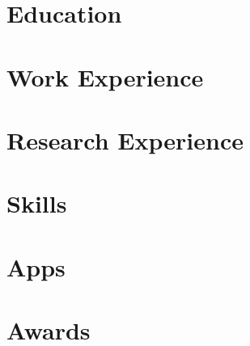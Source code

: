 \documentclass[10pt,a4paper]{mycv}
\begin{document}
\cfoot{\sansc \thepage}
\makecvtitle

\section{Education}


\section{Work Experience}


\section{Research Experience}


\section{Skills}


\section{Apps}


\begingroup
\setlength\bibitemsep{2ex}
\printbibliography[title=Papers, nottype=unpublished]
\endgroup

\begingroup
\setlength\bibitemsep{2ex}
\printbibliography[title=Talks, type=unpublished]
\endgroup


\section{Awards}

\end{document}
